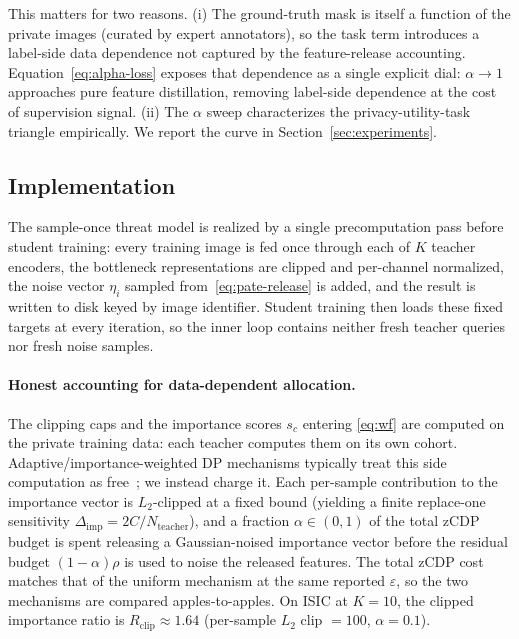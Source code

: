 This matters for two reasons. (i) The ground-truth mask is itself a
function of the private images (curated by expert annotators), so the
task term introduces a label-side data dependence not captured by the
feature-release accounting. Equation~\eqref{eq:alpha-loss} exposes
that dependence as a single explicit dial: $\alpha\!\to\!1$ approaches
pure feature distillation, removing label-side dependence at the cost
of supervision signal. (ii) The $\alpha$ sweep characterizes the
privacy-utility-task triangle empirically. We report the curve in
Section~\ref{sec:experiments}.

\subsection{Implementation}
\label{ssec:impl}

The sample-once threat model is realized by a single precomputation
pass before student training: every training image is fed once
through each of $K$ teacher encoders, the bottleneck representations
are clipped and per-channel normalized, the noise vector $\eta_i$
sampled from~\eqref{eq:pate-release} is added, and the result is
written to disk keyed by image identifier. Student training then
loads these fixed targets at every iteration, so the inner loop
contains neither fresh teacher queries nor fresh noise samples.

\paragraph{Honest accounting for data-dependent allocation.}
The clipping caps and the importance scores $s_c$ entering
\eqref{eq:wf} are computed on the private training data: each teacher
computes them on its own cohort. Adaptive/importance-weighted DP
mechanisms typically treat this side computation as
free~\cite{li2024anadp,yilmaz2025csi}; we instead charge it. Each
per-sample contribution to the importance vector is $L_2$-clipped at a
fixed bound (yielding a finite replace-one sensitivity
$\Delta_{\mathrm{imp}}=2C/N_{\mathrm{teacher}}$), and a fraction
$\alpha\in(0,1)$ of the total zCDP budget is spent releasing a
Gaussian-noised importance vector before the residual budget
$(1{-}\alpha)\rho$ is used to noise the released features. The total
zCDP cost matches that of the uniform mechanism at the same reported
$\varepsilon$, so the two mechanisms are compared apples-to-apples.
On ISIC at $K{=}10$, the clipped importance ratio is
$R_{\mathrm{clip}}\!\approx\!1.64$ (per-sample $L_2$ clip $=100$,
$\alpha{=}0.1$).

